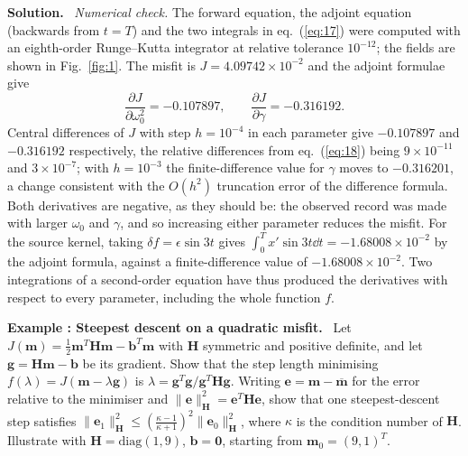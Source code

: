 \documentclass[a4paper,12pt]{paper}
\newcounter{example}
\renewenvironment{example}[1]{%
  \refstepcounter{example}%
  \begin{mdframed}[linewidth=1pt,innertopmargin=6pt,innerbottommargin=6pt]%
  \noindent\textbf{Example \theexample: #1.}\ }{%
  \end{mdframed}}
\newenvironment{solution}{\par\noindent\textbf{Solution.}\ }{\par\medskip}
\begin{document}
\begin{solution}
\emph{Numerical check.} The forward equation, the adjoint equation (backwards from $t=T$) and the two integrals in
eq.~(\ref{eq:17}) were computed with an eighth-order Runge--Kutta integrator at relative tolerance $10^{-12}$; the fields are
shown in Fig.~\ref{fig:1}. The misfit is $J=4.09742\times10^{-2}$ and the adjoint formulae give
\begin{equation}
\frac{\partial J}{\partial\omega_{0}^{2}}=-0.107897,\qquad \frac{\partial J}{\partial\gamma}=-0.316192.
\label{eq:18}
\end{equation}
Central differences of $J$ with step $h=10^{-4}$ in each parameter give $-0.107897$ and $-0.316192$ respectively, the relative
differences from eq.~(\ref{eq:18}) being $9\times10^{-11}$ and $3\times10^{-7}$; with $h=10^{-3}$ the finite-difference value
for $\gamma$ moves to $-0.316201$, a change consistent with the $O(h^{2})$ truncation error of the difference formula. Both
derivatives are negative, as they should be: the observed record was made with larger $\omega_{0}$ and $\gamma$, and so
increasing either parameter reduces the misfit. For the source kernel, taking $\delta f=\epsilon\sin3t$ gives
$\int_{0}^{T}x'\sin3t\dd t=-1.68008\times10^{-2}$ by the adjoint formula, against a finite-difference value of
$-1.68008\times10^{-2}$. Two integrations of a second-order equation have thus produced the derivatives with respect to every parameter, including the whole function $f$.
\end{solution}

\begin{example}{Steepest descent on a quadratic misfit}
Let $J(\mathbf{m})=\frac{1}{2}\mathbf{m}^{T}\mathbf{H}\mathbf{m}-\mathbf{b}^{T}\mathbf{m}$ with $\mathbf{H}$ symmetric and positive
definite, and let $\mathbf{g}=\mathbf{H}\mathbf{m}-\mathbf{b}$ be its gradient. Show that the step length minimising
$f(\lambda)=J(\mathbf{m}-\lambda\mathbf{g})$ is $\lambda=\mathbf{g}^{T}\mathbf{g}/\mathbf{g}^{T}\mathbf{H}\mathbf{g}$.
Writing $\mathbf{e}=\mathbf{m}-\overline{\mathbf{m}}$ for the error relative to the minimiser and
$\|\mathbf{e}\|_{\mathbf{H}}^{2}=\mathbf{e}^{T}\mathbf{H}\mathbf{e}$, show that one steepest-descent step satisfies
$\|\mathbf{e}_{1}\|_{\mathbf{H}}^{2}\le\left(\frac{\kappa-1}{\kappa+1}\right)^{2}\|\mathbf{e}_{0}\|_{\mathbf{H}}^{2}$,
where $\kappa$ is the condition number of $\mathbf{H}$. Illustrate with $\mathbf{H}=\mathrm{diag}(1,9)$, $\mathbf{b}=\mathbf{0}$,
starting from $\mathbf{m}_{0}=(9,1)^{T}$.
\end{example}
\end{document}
